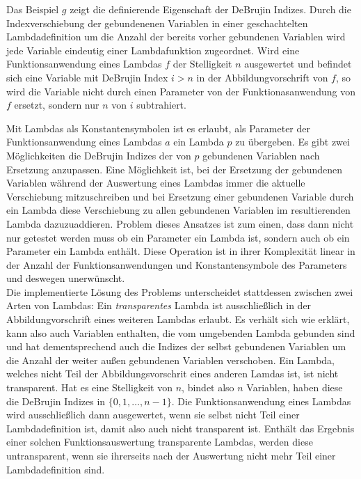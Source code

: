\documentclass{scrartcl}
\numberwithin{figure}{section} %
\theoremstyle{definition} %
\begin{document}
\begin{dLambda}
Das Beispiel $g$ zeigt die definierende Eigenschaft der DeBrujin Indizes. Durch die Indexverschiebung der gebundenenen Variablen in einer geschachtelten Lambdadefinition um die Anzahl der bereits vorher gebundenen Variablen wird jede Variable eindeutig einer Lambdafunktion zugeordnet. Wird eine Funktionsanwendung eines Lambdas $f$ der Stelligkeit $n$ ausgewertet und befindet sich eine Variable mit DeBrujin Index $i > n$ in der Abbildungvorschrift von $f$, so wird die Variable nicht durch einen Parameter von der Funktionasanwendung von $f$ ersetzt, sondern nur $n$ von $i$ subtrahiert.
\end{dLambda}

Mit Lambdas als Konstantensymbolen ist es erlaubt, als Parameter der Funktionsanwendung eines Lambdas $a$ ein Lambda $p$ zu übergeben. Es gibt zwei Möglichkeiten die DeBrujin Indizes der von $p$ gebundenen Variablen nach Ersetzung anzupassen. 
Eine Möglichkeit ist, bei der Ersetzung der gebundenen Variablen während der Auswertung eines Lambdas immer die aktuelle Verschiebung mitzuschreiben und bei Ersetzung einer gebundenen Variable durch ein Lambda diese Verschiebung zu allen gebundenen Variablen im resultierenden Lambda dazuzuaddieren. Problem dieses Ansatzes ist zum einen, dass dann nicht nur getestet werden muss ob ein Parameter ein Lambda ist, sondern auch ob ein Parameter ein Lambda enthält. Diese Operation ist in ihrer Komplexität linear in der Anzahl der Funktionsanwendungen und Konstantensymbole des Parameters und deswegen unerwünscht. \\
Die implementierte Lösung des Problems unterscheidet stattdessen zwischen zwei Arten von Lambdas: Ein \emph{transparentes} Lambda ist ausschließlich in der Abbildungvorschrift eines weiteren Lambdas erlaubt. Es verhält sich wie erklärt, kann also auch Variablen enthalten, die vom umgebenden Lambda gebunden sind und hat dementsprechend auch die Indizes der selbst gebundenen Variablen um die Anzahl der weiter außen gebundenen Variablen verschoben. Ein Lambda, welches nicht Teil der Abbildungsvorschrit eines anderen Lamdas ist, ist nicht transparent. Hat es eine Stelligkeit von $n$, bindet also $n$ Variablen, haben diese die DeBrujin Indizes in $\{0, 1, \dots, n-1\}$. Die Funktionsanwendung eines Lambdas wird ausschließlich dann ausgewertet, wenn sie selbst nicht Teil einer Lambdadefinition ist, damit also auch nicht transparent ist. 
Enthält das Ergebnis einer solchen Funktionsauswertung transparente Lambdas, werden diese untransparent, wenn sie ihrerseits nach der Auswertung nicht mehr Teil einer Lambdadefinition sind. 
\end{document}
